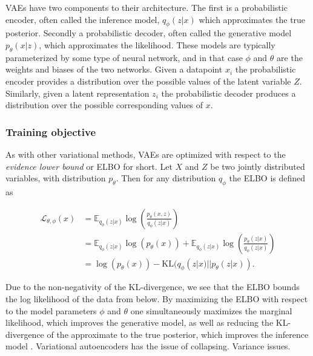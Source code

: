 \documentclass[../../thesis.tex]{subfiles}
\begin{document}
VAEs have two components to their architecture. The first is a probabilistic encoder, often called the inference model, $q_\phi(z|x)$ which approximates the true posterior. Secondly a probabilistic decoder, often called the generative model $p_\theta(x|z)$, which approximates the likelihood. These models are typically parameterized by some type of neural network, and in that case $\phi$ and $\theta$ are the weights and biases of the two networks. Given a datapoint $x_i$ the probabilistic encoder provides a distribution over the possible values of the latent variable $Z$. Similarly, given a latent representation $z_i$ the probabilistic decoder produces a distribution over the possible corresponding values of $x$.

\subsubsection{Training objective}

As with other variational methods, VAEs are optimized with respect to the \textit{evidence lower bound} or ELBO for short. Let $X$ and $Z$ be two jointly distributed variables, with distribution $p_\theta$. Then for any distribution $q_\phi$ the ELBO is defined as

\begin{equation}
    \begin{aligned}
        \label{eq:ELBO}
        \mathcal{L}_{\theta,\phi}(x) 
        &= \mathbb{E}_{q_\phi(z|x)} \log \left( \frac{p_\theta(x,z)}{q_\phi(z|x)}\right) \\ 
        &=  \mathbb{E}_{q_\phi(z|x)} \log \left( p_\theta(x)\right) + \mathbb{E}_{q_\phi(z|x)} \log \left( \frac{p_\theta(z|x)}{q_\phi(z|x)}\right) \\
        &= \log \left( p_\theta(x)\right) - \textrm{KL}(q_\phi(z|x)|| p_\theta(z|x)).
    \end{aligned}
\end{equation}

Due to the non-negativity of the KL-divergence, we see that the ELBO bounds the log likelihood of the data from below. By maximizing the ELBO with respect to the model parameters $\phi$ and $\theta$ one simultaneously maximizes the marginal likelihood, which improves the generative model, as well as reducing the KL-divergence of the approximate to the true posterior, which improves the inference model \cite{VAE}.\newline
{}
Variational autoencoders has the issue of collapsing. Variance issues.
\end{document}

